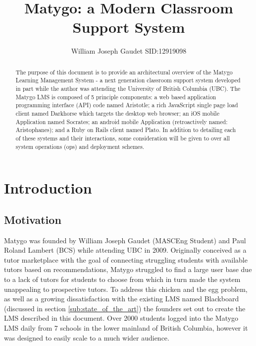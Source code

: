 \documentclass[a4paper,12pt,titlepage]{report}
\title{Matygo: a Modern Classroom Support System}
\author{William Joseph Gaudet SID:12919098}
\begin{document}
\maketitle

\newpage
\tableofcontents
\newpage

\begin{abstract}
The purpose of this document is to provide an architectural overview of the Matygo Learning Management System - a next generation classroom support system developed in part while the author was attending the University of British Columbia (UBC).
The Matygo LMS is composed of 5 principle components: a web based application programming interface (API) code named Aristotle; a rich JavaScript single page load client named Darkhorse which targets the desktop web browser; an iOS mobile Application named Socrates; an android mobile Application (retroactively named: Aristophanes);  and a Ruby on Rails client named Plato. 
In addition to detailing each of these systems and their interactions, some consideration will be given to over all system operations (ops) and deployment schemes.
\end{abstract}

\section{Introduction} %
\label{sec:introduction}

\subsection{Motivation} %
\label{sub:motivation}

Matygo was founded by William Joseph Gaudet (MASCEng Student) and Paul Roland Lambert (BCS) while attending UBC in 2009. 
Originally conceived as a tutor marketplace with the goal of connecting struggling students with available tutors based on recommendations, Matygo struggled to find a large user base due to a lack of tutors for students to choose from which in turn made the system unappealing to prospective tutors.
To address this chicken and the egg problem, as well as a growing dissatisfaction with the existing LMS named Blackboard (discussed in section \ref{sub:state_of_the_art}) the founders set out to create the LMS described in this document. 
Over 2000 students logged into the Matygo LMS daily from 7 schools in the lower mainland of British Columbia, however it was designed to easily scale to a much wider audience.
\end{document}
